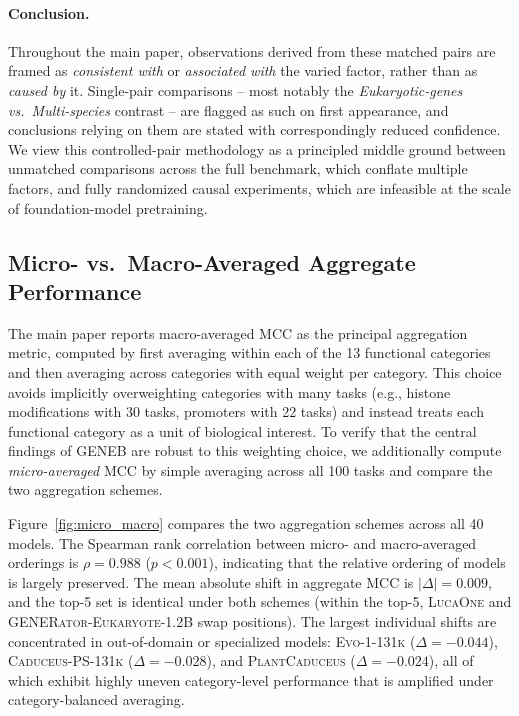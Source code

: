 \documentclass{llmxive}
\begin{document}
\paragraph{Conclusion.}
Throughout the main paper, observations derived from these matched pairs
are framed as \emph{consistent with} or \emph{associated with} the
varied factor, rather than as \emph{caused by} it. Single-pair
comparisons -- most notably the \emph{Eukaryotic-genes vs.\ Multi-species}
contrast -- are flagged as such on first appearance, and conclusions
relying on them are stated with correspondingly reduced confidence. We
view this controlled-pair methodology as a principled middle ground
between unmatched comparisons across the full benchmark, which conflate
multiple factors, and fully randomized causal experiments, which are
infeasible at the scale of foundation-model pretraining.

\subsection{Micro- vs.\ Macro-Averaged Aggregate Performance}
\label{subsec:macro_micro}

The main paper reports macro-averaged MCC as the principal aggregation
metric, computed by first averaging within each of the 13 functional
categories and then averaging across categories with equal weight per
category. This choice avoids implicitly overweighting categories with
many tasks (e.g., histone modifications with 30 tasks, promoters with
22 tasks) and instead treats each functional category as a unit of
biological interest. To verify that the central findings of GENEB are
robust to this weighting choice, we additionally compute
\emph{micro-averaged} MCC by simple averaging across all 100 tasks and
compare the two aggregation schemes.

Figure~\ref{fig:micro_macro} compares the two aggregation schemes
across all 40 models. The Spearman rank correlation between micro-
and macro-averaged orderings is $\rho = 0.988$ ($p < 0.001$),
indicating that the relative ordering of models is largely preserved.
The mean absolute shift in aggregate MCC is $|\Delta| = 0.009$, and
the top-5 set is identical under both schemes (within the top-5,
\textsc{LucaOne} and \textsc{GENERator-Eukaryote-1.2B} swap positions).
The largest individual shifts are concentrated in out-of-domain or
specialized models: \textsc{Evo-1-131k} ($\Delta = -0.044$),
\textsc{Caduceus-PS-131k} ($\Delta = -0.028$), and
\textsc{PlantCaduceus} ($\Delta = -0.024$), all of which exhibit
highly uneven category-level performance that is amplified under
category-balanced averaging.
\end{document}
